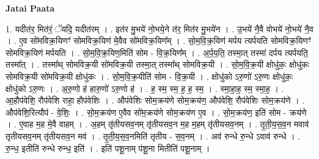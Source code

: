 \documentclass[17pt]{extarticle}
\begin{document}
\textbf{Jatai Paata} \newline

1. यदीत॑र॒ मित॑रं॒ ॅयदि॒ यदीत॑रम् । . इत॑र मु॒भये॑ नो॒भये॒ने त॑र॒ मित॑र मु॒भये॑न । . उ॒भये॑ नै॒वै वोभये॑ नो॒भये॑ नै॒व । . ए॒व सो॑मविक्र॒यिणꣳ॑ सोमविक्र॒यिण॑ मे॒वैव सो॑मविक्र॒यिण᳚म् । . सो॒म॒वि॒क्र॒यिण॑ मर्पय त्यर्पयति सोमविक्र॒यिणꣳ॑ सोमविक्र॒यिण॑ मर्पयति । . सो॒म॒वि॒क्र॒यिण॒मिति॑ सोम - वि॒क्र॒यिण᳚म् । . अ॒र्प॒य॒ति॒ तस्मा॒त् तस्मा॑ दर्पय त्यर्पयति॒ तस्मा᳚त् । . तस्मा᳚थ् सोमविक्र॒यी सो॑मविक्र॒यी तस्मा॒त् तस्मा᳚थ् सोमविक्र॒यी । . सो॒म॒वि॒क्र॒यी क्षोधु॑कः॒ क्षोधु॑कः सोमविक्र॒यी सो॑मविक्र॒यी क्षोधु॑कः । . सो॒म॒वि॒क्र॒यीति॑ सोम - वि॒क्र॒यी । . क्षोधु॑को ऽरु॒णो॑ ऽरु॒णः क्षोधु॑कः॒ क्षोधु॑को ऽरु॒णः । . अ॒रु॒णो ह॑ हारु॒णो॑ ऽरु॒णो ह॑ । . ह॒ स्म॒ स्म॒ ह॒ ह॒ स्म॒ । . स्मा॒हा॒ह॒ स्म॒ स्मा॒ह॒ । . आ॒हौप॑वेशि॒ रौप॑वेशि राहा॒ हौप॑वेशिः । . औप॑वेशिः सोम॒क्रय॑णे सोम॒क्रय॑ण॒ औप॑वेशि॒ रौप॑वेशिः सोम॒क्रय॑णे । . औप॑वेशि॒रित्यौप॑ - वे॒शिः॒ । . सो॒म॒क्रय॑ण ए॒वैव सो॑म॒क्रय॑णे सोम॒क्रय॑ण ए॒व । . सो॒म॒क्रय॑ण॒ इति॑ सोम - क्रय॑णे । . ए॒वाह म॒ह मे॒वै वाहम् । . अ॒हम् तृ॑तीयसव॒नम् तृ॑तीयसव॒न म॒ह म॒हम् तृ॑तीयसव॒नम् । . तृ॒ती॒य॒स॒व॒न मवाव॑ तृतीयसव॒नम् तृ॑तीयसव॒न मव॑ । . तृ॒ती॒य॒स॒व॒नमिति॑ तृतीय - स॒व॒नम् । . अव॑ रुन्धे रु॒न्धे ऽवाव॑ रुन्धे । . रु॒न्ध॒ इतीति॑ रुन्धे रुन्ध॒ इति॑ । . इति॑ पशू॒नाम् प॑शू॒ना मितीति॑ पशू॒नाम् । \newline
\end{document}
